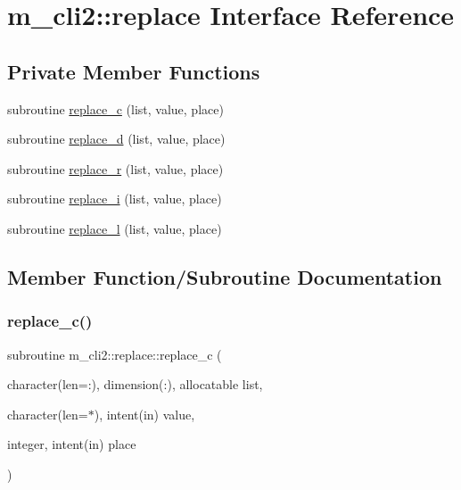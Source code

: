\hypertarget{interfacem__cli2_1_1replace}{}\section{m\+\_\+cli2\+:\+:replace Interface Reference}
\label{interfacem__cli2_1_1replace}
\subsection*{Private Member Functions}
\begin{DoxyCompactItemize}
\item 
subroutine \mbox{\hyperlink{interfacem__cli2_1_1replace_ab4d59b6a69d2768bf724f53604b3d0a9}{replace\+\_\+c}} (list, value, place)
\item 
subroutine \mbox{\hyperlink{interfacem__cli2_1_1replace_a606ded35a3f0d06cb61a28db82ab5ae7}{replace\+\_\+d}} (list, value, place)
\item 
subroutine \mbox{\hyperlink{interfacem__cli2_1_1replace_adf284ee215097b8416e81532b7d4251b}{replace\+\_\+r}} (list, value, place)
\item 
subroutine \mbox{\hyperlink{interfacem__cli2_1_1replace_a73a0dab38328c3db8a7eef48e27390bd}{replace\+\_\+i}} (list, value, place)
\item 
subroutine \mbox{\hyperlink{interfacem__cli2_1_1replace_a9c995edced1d2665777e794a3aa5b2a0}{replace\+\_\+l}} (list, value, place)
\end{DoxyCompactItemize}


\subsection{Member Function/\+Subroutine Documentation}
\mbox{\label{interfacem__cli2_1_1replace_ab4d59b6a69d2768bf724f53604b3d0a9}} 
\subsubsection{\texorpdfstring{replace\+\_\+c()}{replace\_c()}}
{\footnotesize\ttfamily subroutine m\+\_\+cli2\+::replace\+::replace\+\_\+c (\begin{DoxyParamCaption}\item[{character(len=\+:), dimension(\+:), allocatable}]{list,  }\item[{character(len=$\ast$), intent(in)}]{value,  }\item[{integer, intent(in)}]{place }\end{DoxyParamCaption})\hspace{0.3cm}{\ttfamily [private]}}

